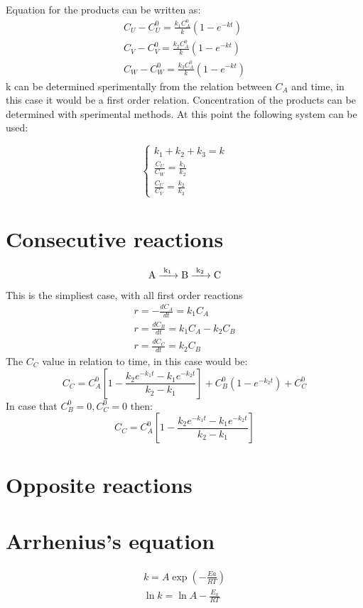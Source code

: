 \documentclass[../Master.tex]{subfiles}
\begin{document}
\begin{multicols*}{2}
	Equation for the products can be written as:
	\begin{gather*}
		C_{U} - C_{U}^{0} = \frac{k_{1}C_{A}^{0}}{k}(1-e^{-kt})\\
		C_{V} - C_{V}^{0} = \frac{k_{2}C_{A}^{0}}{k}(1-e^{-kt})\\
		C_{W} - C_{W}^{0} = \frac{k_{3}C_{A}^{0}}{k}(1-e^{-kt})
	\end{gather*}
	k can be determined sperimentally from the relation between \( C_{A}  \) and time, in this case it would be a first order relation.
	Concentration of the products can be determined with sperimental methods. At this point the following system can be used:

	\begin{equation*}
		\begin{cases}
			k_{1} + k_{2} + k_{3} = k                  \\
			\frac{C_{U}}{C_{W} } = \frac{k_{1}}{k_{2}} \\
			\frac{C_{U} }{C_{V}} = \frac{k_{2}}{k_{3}}
		\end{cases}
	\end{equation*}

	\section{Consecutive reactions}
	\begin{gather*}
		\ce{ A ->[{k_{1}}] B ->[{k_{2}}]C}\\
	\end{gather*}
	This is the simpliest case, with all first order reactions
	\begin{gather*}
		r = -\frac{dC_{A}}{dt} = k_{1}C_{A}\\
		r = \frac{dC_{B}}{dt} = k_{1}C_{A} - k_{2}C_{B}\\
		r = \frac{dC_{C}}{dt} = k_{2}C_{B}
	\end{gather*}
	The $C_{C}$ value in relation to time, in this case would be:
	\[
		C_{C} = C_{A}^{0}\left[1 -\frac{k_{2}e^{-k_{1}t} -k_{1}e^{-k_{2}t}}{k_{2}-k_{1}} \right] + C_{B}^{0}(1-e^{-k_{2}t})+C_{C}^{0}
	\]
	In case that \( C_{B}^0=0, C_{C}^0 = 0 \) then:
	\[
		C_{C} = C_{A}^{0}\left[1 -\frac{k_{2}e^{-k_{1}t} -k_{1}e^{-k_{2}t}}{k_{2}-k_{1}} \right]
	\]
	\section{Opposite reactions}

	\section{Arrhenius's equation}
	\begin{gather*}
		k = A \exp \left( -\frac{Ea}{RT} \right)\\
		\ln k = \ln A - \frac{E_{a}}{RT}
	\end{gather*}
\end{multicols*}
\end{document}
